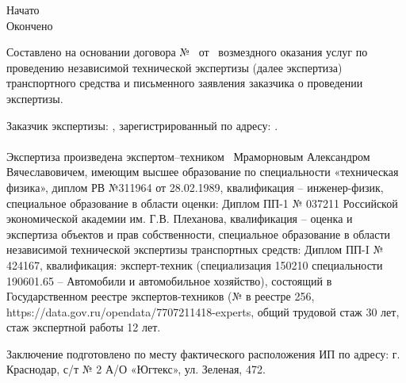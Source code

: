 \noindent\parbox[l][16mm]{16.5cm}
{\def\hrf#1{\hbox to#1{\hrulefill}}
	\noindent Начато\hfill            \datastart\\%
	Окончено\hfill                \dataend
}
\relax

%
%
%
\vspace{4mm}
Составлено на основании	договора № \NomerDoc\, от \dog\,  возмездного оказания услуг по проведению независимой технической экспертизы (далее экспертиза)  транспортного средства и письменного заявления заказчика о проведении экспертизы. 

Заказчик  экспертизы:  , зарегистрированный по адресу: .



\paragraph*{}
\noindent Экспертиза произведена  экспертом--техником
\,  Мраморновым Александром Вячеславовичем, имеющим высшее образование по специальности «техническая физика», диплом РВ №311964 от 28.02.1989, квалификация -- инженер-физик, специальное образование в области оценки: Диплом ПП-1 № 037211 Российской экономической академии им. Г.В. Плеханова, квалификация -- оценка и экспертиза объектов и прав собственности, специальное образование в области независимой технической экспертизы транспортных средств: Диплом ПП-I № 424167, квалификация: эксперт-техник (специализация 150210 специальности 190601.65 – Автомобили и автомобильное хозяйство), состоящий в Государственном реестре экспертов-техников (№ в реестре 256, https://data.gov.ru/opendata/7707211418-experts,  общий трудовой  стаж 30 лет, стаж  экспертной работы  12 лет. \par Заключение подготовлено по месту фактического расположения ИП по адресу: г. Краснодар, с/т № 2 А/О «Югтекс», ул. Зеленая, 472.
